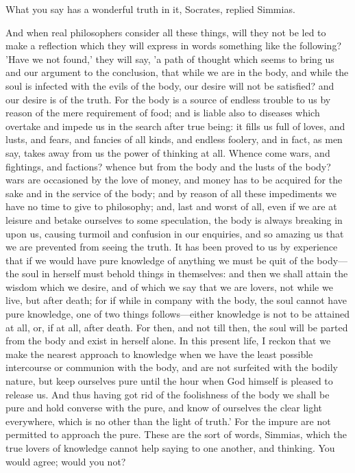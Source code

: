 What you say has a wonderful truth in it, Socrates, replied Simmias.

And when real philosophers consider all these things, will they not be led
to make a reflection which they will express in words something like the
following? 'Have we not found,' they will say, 'a path of thought which
seems to bring us and our argument to the conclusion, that while we are in
the body, and while the soul is infected with the evils of the body, our
desire will not be satisfied? and our desire is of the truth. For the body
is a source of endless trouble to us by reason of the mere requirement of
food; and is liable also to diseases which overtake and impede us in the
search after true being: it fills us full of loves, and lusts, and fears,
and fancies of all kinds, and endless foolery, and in fact, as men say,
takes away from us the power of thinking at all. Whence come wars, and
fightings, and factions? whence but from the body and the lusts of the
body? wars are occasioned by the love of money, and money has to be
acquired for the sake and in the service of the body; and by reason of all
these impediments we have no time to give to philosophy; and, last and
worst of all, even if we are at leisure and betake ourselves to some
speculation, the body is always breaking in upon us, causing turmoil and
confusion in our enquiries, and so amazing us that we are prevented from
seeing the truth. It has been proved to us by experience that if we would
have pure knowledge of anything we must be quit of the body—the soul
in herself must behold things in themselves: and then we shall attain the
wisdom which we desire, and of which we say that we are lovers, not while
we live, but after death; for if while in company with the body, the soul
cannot have pure knowledge, one of two things follows—either
knowledge is not to be attained at all, or, if at all, after death. For
then, and not till then, the soul will be parted from the body and exist
in herself alone. In this present life, I reckon that we make the nearest
approach to knowledge when we have the least possible intercourse or
communion with the body, and are not surfeited with the bodily nature, but
keep ourselves pure until the hour when God himself is pleased to release
us. And thus having got rid of the foolishness of the body we shall be
pure and hold converse with the pure, and know of ourselves the clear
light everywhere, which is no other than the light of truth.' For the
impure are not permitted to approach the pure. These are the sort of
words, Simmias, which the true lovers of knowledge cannot help saying to
one another, and thinking. You would agree; would you not?

